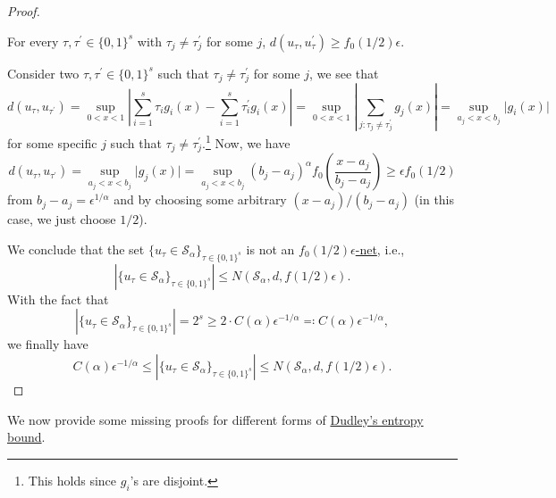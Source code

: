 \begin{proof}
	\begin{claim}
		For every \(\tau , \tau ^{\prime} \in \{ 0, 1 \}^s \) with \(\tau _j \neq \tau _j^{\prime} \) for some \(j\), \(d(u_{\tau } , u_{\tau} ^{\prime} ) \geq f_0(1 / 2) \epsilon \).
	\end{claim}
	\begin{explanation}
		Consider two \(\tau , \tau ^{\prime} \in \{ 0, 1 \} ^s\) such that \(\tau _j \neq \tau ^{\prime} _j\) for some \(j\), we see that
		\[
			d (u_{\tau } , u_{\tau ^{\prime} })
			= \sup _{0 < x < 1} \left\vert \sum_{i=1}^{s} \tau _i g_i (x) - \sum_{i=1}^{s} \tau ^{\prime} _i g_i (x) \right\vert
			= \sup _{0 < x < 1} \left\vert \sum_{j\colon \tau _j \neq \tau ^{\prime} _j} g_j(x) \right\vert
			= \sup _{a_j < x < b_j} \vert g_i(x) \vert
		\]
		for some specific \(j\) such that \(\tau _j \neq \tau _j ^{\prime} \).\footnote{This holds since \(g_i\)'s are disjoint.} Now, we have
		\[
			d (u_{\tau } , u_{\tau ^{\prime} })
			= \sup _{a_j < x < b_j} \vert g_j (x) \vert
			= \sup _{a_j < x < b_j} (b_j - a_j)^\alpha f_0 \left( \frac{x - a_j}{b_j - a_j} \right)
			\geq \epsilon f_0(1 / 2)
		\]
		from \(b_j - a_j = \epsilon ^{1 / \alpha }\) and by choosing some arbitrary \((x - a_j) / (b_j - a_j)\) (in this case, we just choose \(1 / 2\)).
	\end{explanation}
	We conclude that the set \(\{ u_{\tau } \in \mathcal{S} _\alpha  \}_{\tau \in \{ 0, 1 \} ^s} \) is not an \hyperref[def:eps-net]{\(f_0(1 / 2) \epsilon \)-net}, i.e.,
	\[
		\left\vert \{ u_{\tau } \in \mathcal{S} _\alpha  \}_{\tau \in \{ 0, 1 \} ^s} \right\vert
		\leq N(\mathcal{S} _\alpha , d , f(1 / 2) \epsilon).
	\]
	With the fact that
	\[
		\left\vert \{ u_{\tau } \in \mathcal{S} _\alpha  \}_{\tau \in \{ 0, 1 \} ^s} \right\vert
		= 2^s
		\geq 2\cdot C(\alpha )\epsilon ^{-1 / \alpha }
		\eqqcolon C(\alpha )\epsilon ^{-1 / \alpha },
	\]
	we finally have
	\[
		C(\alpha )\epsilon ^{-1 / \alpha }
		\leq \left\vert \{ u_{\tau } \in \mathcal{S} _\alpha  \}_{\tau \in \{ 0, 1 \} ^s} \right\vert
		\leq N(\mathcal{S} _\alpha , d , f(1 / 2) \epsilon ).
	\]
\end{proof}

We now provide some missing proofs for different forms of \hyperref[thm:Dudley-entropy-bound]{Dudley's entropy bound}.

